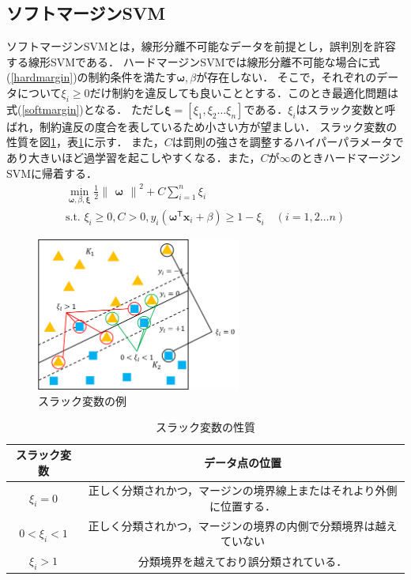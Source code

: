 \documentclass[11pt,a4paper,titlepage]{ltjsarticle}
\begin{document}
\subsection{ソフトマージンSVM}
\label{sec:softmargin}
ソフトマージンSVMとは，線形分離不可能なデータを前提とし，誤判別を許容する線形SVMである．
ハードマージンSVMでは線形分離不可能な場合に式(\ref{hardmargin})の制約条件を満たす$\bm{\omega},\beta$が存在しない．
そこで，それぞれのデータについて$\xi_i \geq 0$だけ制約を違反しても良いこととする．このとき最適化問題は式(\ref{softmargin})となる．
ただし$\bm{\xi}=[\xi_1,\xi_2\dots\xi_n]$である．$\xi_i$はスラック変数と呼ばれ，制約違反の度合を表しているため小さい方が望ましい．
スラック変数の性質を図\ref{fig:slack}，表\ref{tab:slack}に示す．
また，$C$は罰則の強さを調整するハイパーパラメータであり大きいほど過学習を起こしやすくなる\cite{Ckernel}．また，$C$が$\infty$のときハードマージンSVMに帰着する．
\begin{equation}
    \label{softmargin}
    \begin{gathered}
        \min_{\bm{\omega},\beta,\bm{\xi}}\frac{1}{2}\begin{Vmatrix}\bm{\omega}\end{Vmatrix}^2 + C\sum_{i=1}^{n}\xi_i\\
        \text{s.t. } \xi_i\geq0,C > 0, y_i(\bm{\omega}^\mathsf{T}\bm{x}_i + \beta) \geq 1-\xi_i \quad  (i = 1,2\dots n)
    \end{gathered}
\end{equation}
\begin{figure}[H]
    \centering
    \includegraphics[width = 0.6\textwidth]{image/soft-mergin.png}
    \caption{スラック変数の例}
    \label{fig:slack}
\end{figure}
\begin{table}[H]
    \caption{スラック変数の性質}
    \begin{tabular}{|c|c|}\hline
        スラック変数 & データ点の位置\\ \hline
        $\xi_i = 0$ & 正しく分類されかつ，マージンの境界線上またはそれより外側に位置する．\\\hline
        $0 < \xi_i <1$ & 正しく分類されかつ，マージンの境界の内側で分類境界は越えていない \\ \hline
        $\xi_i > 1$ & 分類境界を越えており誤分類されている．\\\hline
    \end{tabular}
    \label{tab:slack}
\end{table}
\end{document}
